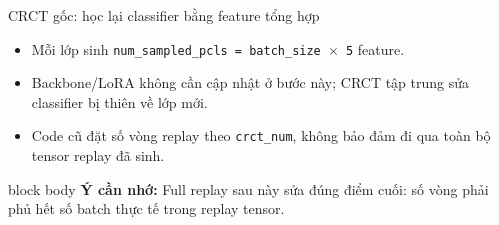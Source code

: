\documentclass[aspectratio=169,11pt]{beamer}
\newcommand{\remember}[1]{%
  \vfill
  \begin{beamercolorbox}[wd=\textwidth,sep=0.22cm,rounded=true]{block body}
    \textbf{Ý cần nhớ:} #1
  \end{beamercolorbox}
}
\begin{document}
\begin{frame}{CRCT gốc: học lại classifier bằng feature tổng hợp}
  \centering

  \vspace{0.6cm}
  \begin{itemize}\setlength\itemsep{0.3cm}
    \item Mỗi lớp sinh \texttt{num\_sampled\_pcls = batch\_size $\times$ 5} feature.
    \item Backbone/LoRA không cần cập nhật ở bước này; CRCT tập trung sửa classifier bị thiên về lớp mới.
    \item Code cũ đặt số vòng replay theo \texttt{crct\_num}, không bảo đảm đi qua toàn bộ tensor replay đã sinh.
  \end{itemize}
  \remember{Full replay sau này sửa đúng điểm cuối: số vòng phải phủ hết số batch thực tế trong replay tensor.}
\end{frame}
\end{document}
